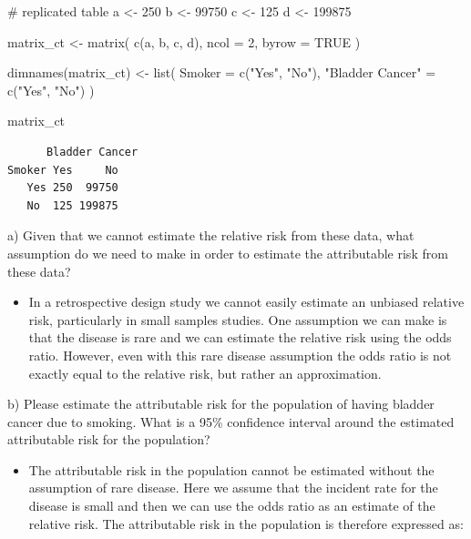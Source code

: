 \documentclass[
  letterpaper,
  DIV=11,
  numbers=noendperiod]{scrartcl}
\newenvironment{Shaded}{\begin{snugshade}}{\end{snugshade}}
\newcommand{\AttributeTok}[1]{\textcolor[rgb]{0.40,0.45,0.13}{#1}}
\newcommand{\CommentTok}[1]{\textcolor[rgb]{0.37,0.37,0.37}{#1}}
\newcommand{\ConstantTok}[1]{\textcolor[rgb]{0.56,0.35,0.01}{#1}}
\newcommand{\DecValTok}[1]{\textcolor[rgb]{0.68,0.00,0.00}{#1}}
\newcommand{\FunctionTok}[1]{\textcolor[rgb]{0.28,0.35,0.67}{#1}}
\newcommand{\NormalTok}[1]{\textcolor[rgb]{0.00,0.23,0.31}{#1}}
\newcommand{\OtherTok}[1]{\textcolor[rgb]{0.00,0.23,0.31}{#1}}
\newcommand{\StringTok}[1]{\textcolor[rgb]{0.13,0.47,0.30}{#1}}
\providecommand{\tightlist}{%
  \setlength{\itemsep}{0pt}\setlength{\parskip}{0pt}}\usepackage{longtable,booktabs,array}
\begin{document}
\begin{Shaded}
\begin{Highlighting}[]
\CommentTok{\# replicated table}
\NormalTok{a }\OtherTok{\textless{}{-}} \DecValTok{250}
\NormalTok{b }\OtherTok{\textless{}{-}} \DecValTok{99750} 
\NormalTok{c }\OtherTok{\textless{}{-}} \DecValTok{125}
\NormalTok{d }\OtherTok{\textless{}{-}} \DecValTok{199875}

\NormalTok{matrix\_ct }\OtherTok{\textless{}{-}} \FunctionTok{matrix}\NormalTok{(}
  \FunctionTok{c}\NormalTok{(a, b, c, d),}
  \AttributeTok{ncol =} \DecValTok{2}\NormalTok{,}
  \AttributeTok{byrow =} \ConstantTok{TRUE}
\NormalTok{)}

\FunctionTok{dimnames}\NormalTok{(matrix\_ct) }\OtherTok{\textless{}{-}} \FunctionTok{list}\NormalTok{(}
  \AttributeTok{Smoker =} \FunctionTok{c}\NormalTok{(}\StringTok{"Yes"}\NormalTok{, }\StringTok{"No"}\NormalTok{),}
  \StringTok{"Bladder Cancer"} \OtherTok{=} \FunctionTok{c}\NormalTok{(}\StringTok{"Yes"}\NormalTok{, }\StringTok{"No"}\NormalTok{)}
\NormalTok{)}

\NormalTok{matrix\_ct}
\end{Highlighting}
\end{Shaded}

\begin{verbatim}
      Bladder Cancer
Smoker Yes     No
   Yes 250  99750
   No  125 199875
\end{verbatim}

a) Given that we cannot estimate the relative risk from these data, what
assumption do we need to make in order to estimate the attributable risk
from these data?

\begin{itemize}
\tightlist
\item
  In a retrospective design study we cannot easily estimate an unbiased
  relative risk, particularly in small samples studies. One assumption
  we can make is that the disease is rare and we can estimate the
  relative risk using the odds ratio. However, even with this rare
  disease assumption the odds ratio is not exactly equal to the relative
  risk, but rather an approximation.
\end{itemize}

b) Please estimate the attributable risk for the population of having
bladder cancer due to smoking. What is a 95\% confidence interval around
the estimated attributable risk for the population?

\begin{itemize}
\tightlist
\item
  The attributable risk in the population cannot be estimated without
  the assumption of rare disease. Here we assume that the incident rate
  for the disease is small and then we can use the odds ratio as an
  estimate of the relative risk. The attributable risk in the population
  is therefore expressed as:
\end{itemize}
\end{document}
